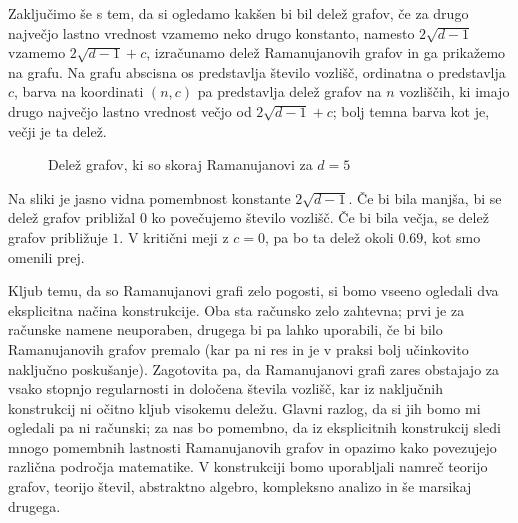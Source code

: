 Zaključimo še s tem, da si ogledamo kakšen bi bil delež grafov, če za drugo največjo lastno vrednost vzamemo neko drugo konstanto, namesto \(2\sqrt{d-1}\) vzamemo \(2\sqrt{d-1} + c\), izračunamo delež Ramanujanovih grafov in ga prikažemo na grafu. Na grafu abscisna os predstavlja število vozlišč, ordinatna o predstavlja \(c\), barva na koordinati \((n,c)\) pa predstavlja delež grafov na \(n\) vozliščih, ki imajo drugo največjo lastno vrednost večjo od \(2\sqrt{d-1}+c\); bolj temna barva kot je, večji je ta delež.
\begin{figure}[H]
    \begin{center}
        
    \end{center}
    \caption{Delež grafov, ki so skoraj Ramanujanovi za \(d=5\)}
\end{figure}
Na sliki je jasno vidna pomembnost konstante \(2\sqrt{d-1}\). Če bi bila manjša, bi se delež grafov približal \(0\) ko povečujemo število vozlišč. Če bi bila večja, se delež grafov približuje \(1\). V kritični meji z \(c=0\), pa bo ta delež okoli \(0.69\), kot smo omenili prej.

Kljub temu, da so Ramanujanovi grafi zelo pogosti, si bomo vseeno ogledali dva eksplicitna načina konstrukcije. Oba sta računsko zelo zahtevna; prvi je za računske namene neuporaben, drugega bi pa lahko uporabili, če bi bilo Ramanujanovih grafov premalo (kar pa ni res in je v praksi bolj učinkovito naključno poskušanje). Zagotovita pa, da Ramanujanovi grafi zares obstajajo za vsako stopnjo regularnosti in določena števila vozlišč, kar iz naključnih konstrukcij ni očitno kljub visokemu deležu. Glavni razlog, da si jih bomo mi ogledali pa ni računski; za nas bo pomembno, da iz eksplicitnih konstrukcij sledi mnogo pomembnih lastnosti Ramanujanovih grafov in opazimo kako povezujejo različna področja matematike. V konstrukciji bomo uporabljali namreč teorijo grafov, teorijo števil, abstraktno algebro, kompleksno analizo in še marsikaj drugega.

